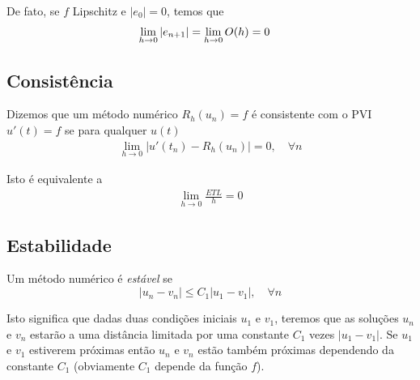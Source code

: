 De fato, se $f$ Lipschitz e $|e_0|=0$, temos que
\begin{eqnarray}
 \lim_{h\rightarrow 0} |e_{n+1}|  &= \lim_{h\rightarrow 0} \mathcal \mathcal{O}(h) = 0
\end{eqnarray}






\subsection{Consistência}
\begin{defn}
Dizemos que um método numérico $R_h(u_n)=f$ é consistente com o PVI $u'(t)=f$ se para qualquer $u(t)$
\begin{eqnarray}
  \lim_{h \rightarrow 0} |u'(t_n)-R_h(u_n)| = 0, \quad  \forall n
\end{eqnarray}
\end{defn}

Isto é equivalente a
\begin{eqnarray}
  \lim_{h \rightarrow 0} \frac{ETL}{h} = 0
\end{eqnarray}



%
%




\subsection{Estabilidade}
\begin{defn}
Um método numérico é \emph{estável} se
$$ |u_n-v_n| \leq  C_1|u_1-v_1|, \quad  \forall n$$
\end{defn}
Isto significa que dadas duas condições iniciais $u_1$ e $v_1$, teremos que as soluções $u_n$ e $v_n$ estarão a uma distância limitada  por uma constante $C_1$ vezes $|u_1-v_1|$. Se $u_1$ e $v_1$ estiverem próximas então $u_n$ e $v_n$ estão também próximas dependendo da constante $C_1$ (obviamente $C_1$ depende da função $f$).


